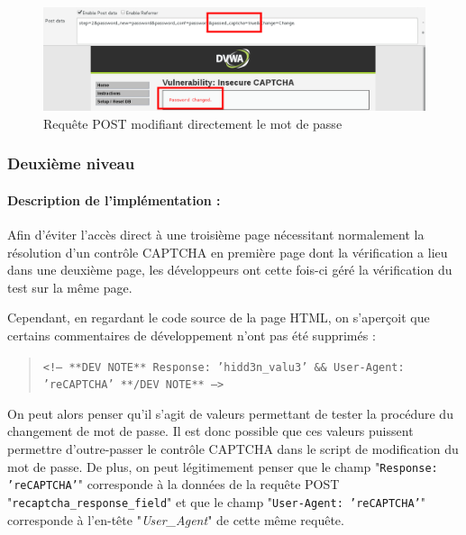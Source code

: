\begin{figure}[!h]
\begin{center}

\includegraphics[scale=0.4]{images/captcha4_1.png}

\caption{Requête POST modifiant directement le mot de passe}
\label{captcha4}
\end{center}
\end{figure}

\subsubsection{Deuxième niveau}

\paragraph{Description de l'implémentation :}

Afin d'éviter l'accès direct à une troisième page nécessitant normalement la résolution d'un contrôle CAPTCHA en première page dont la vérification a lieu dans une deuxième page, les développeurs ont cette fois-ci géré la vérification du test sur la même page.

Cependant, en regardant le code source de la page HTML, on s'aperçoit que certains commentaires de développement n'ont pas été supprimés : 

\begin{quote}
\texttt{<!-- **DEV NOTE**   Response: 'hidd3n\_valu3'   \&\&   User-Agent: 'reCAPTCHA'   **/DEV NOTE** -->}
\end{quote}

On peut alors penser qu'il s'agit de valeurs permettant de tester la procédure du changement de mot de passe. Il est donc possible que ces valeurs puissent permettre d'outre-passer le contrôle CAPTCHA dans le script de modification du mot de passe. De plus, on peut légitimement penser que le champ "\texttt{Response: 'reCAPTCHA'}" corresponde à la données de la requête POST \linebreak "\texttt{recaptcha\_response\_field}" et que le champ "\texttt{User-Agent: 'reCAPTCHA'}" corresponde à l'en-tête "\textit{User\_Agent}" de cette même requête.


